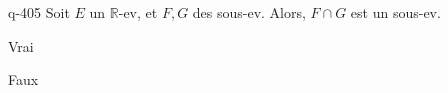 \begin{truefalse}{q-405}
Soit $E$ un $\mathbb R$-ev, et $F,G$ des sous-ev. Alors, $F \cap G$ est un sous-ev.
\item* Vrai
\item Faux
\end{truefalse}

